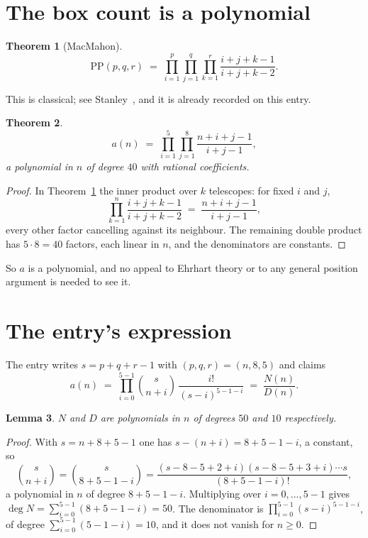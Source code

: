 \documentclass[11pt,a4paper]{article}
\theoremstyle{plain}
\newtheorem{theorem}{Theorem}
\newtheorem{lemma}[theorem]{Lemma}
\theoremstyle{definition}
\begin{document}
\section{The box count is a polynomial}

\begin{theorem}[MacMahon]\label{thm:mm}
\[
\mathrm{PP}(p,q,r)\;=\;\prod_{i=1}^{p}\prod_{j=1}^{q}\prod_{k=1}^{r}
\frac{i+j+k-1}{i+j+k-2} .
\]
\end{theorem}

This is classical; see Stanley~\cite{stanley}, and it is already recorded on this entry.

\begin{theorem}\label{thm:poly}
\[
a(n)\;=\;\prod_{i=1}^{5}\prod_{j=1}^{8}\frac{n+i+j-1}{i+j-1},
\]
a polynomial in $n$ of degree $40$ with rational coefficients.
\end{theorem}

\begin{proof}
In Theorem~\ref{thm:mm} the inner product over $k$ telescopes: for fixed $i$ and $j$,
\[
\prod_{k=1}^{n}\frac{i+j+k-1}{i+j+k-2}\;=\;\frac{n+i+j-1}{i+j-1} ,
\]
every other factor cancelling against its neighbour. The remaining double product has
$5\cdot8=40$ factors, each linear in $n$, and the denominators are constants.
\end{proof}

So $a$ is a polynomial, and no appeal to Ehrhart theory or to any general position argument is
needed to see it.

\section{The entry's expression}

The entry writes $s=p+q+r-1$ with $(p,q,r)=(n,8,5)$ and claims
\[
a(n)\;=\;\prod_{i=0}^{5-1}\binom{s}{n+i}\,\frac{i!}{(s-i)^{5-1-i}}\;=\;
\frac{N(n)}{D(n)} .
\]

\begin{lemma}\label{lem:deg}
$N$ and $D$ are polynomials in $n$ of degrees $50$ and $10$ respectively.
\end{lemma}

\begin{proof}
With $s=n+8+5-1$ one has $s-(n+i)=8+5-1-i$, a constant, so
\[
\binom{s}{n+i}=\binom{s}{8+5-1-i}
=\frac{(s-8-5+2+i)(s-8-5+3+i)\cdots s}{(8+5-1-i)!},
\]
a polynomial in $n$ of degree $8+5-1-i$. Multiplying over $i=0,\dots,5-1$ gives
$\deg N=\sum_{i=0}^{5-1}(8+5-1-i)=50$. The denominator is
$\prod_{i=0}^{5-1}(s-i)^{5-1-i}$, of degree
$\sum_{i=0}^{5-1}(5-1-i)=10$, and it does not vanish for $n\ge0$.
\end{proof}
\end{document}

